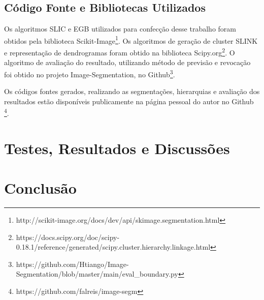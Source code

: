\begin{document}

\subsection{Código Fonte e Bibliotecas Utilizados} \label{ssec:cod_fonte}

Os algoritmos SLIC e EGB utilizados para confecção desse trabalho foram obtidos pela biblioteca Scikit-Image\footnote{http://scikit-image.org/docs/dev/api/skimage.segmentation.html}. 
Os algoritmos de geração de cluster SLINK e representação de dendrogramas foram obtido na biblioteca Scipy.org\footnote{https://docs.scipy.org/doc/scipy-0.18.1/reference/generated/scipy.cluster.hierarchy.linkage.html}. 
O algoritmo de avaliação do resultado, utilizando método de previsão e revocação foi obtido no projeto Image-Segmentation, no Github\footnote{https://github.com/Htiango/Image-Segmentation/blob/master/main/eval\_boundary.py}.

Os códigos fontes gerados, realizando as segmentações, hierarquias e avaliação dos resultados estão disponíveis publicamente na página pessoal do autor no Github \footnote{https://github.com/falreis/image-segm}.




\section{Testes, Resultados e Discussões} \label{sec:testes}



\section{Conclusão} \label{sec:conclusao}




\end{document}
